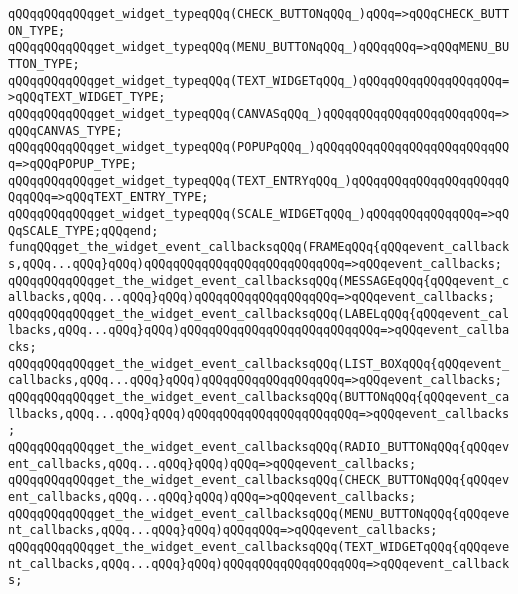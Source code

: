 \verb|qQQqqQQqqQQqget_widget_typeqQQq(CHECK_BUTTONqQQq_)qQQq=>qQQqCHECK_BUTTON_TYPE;|\newline
\verb|qQQqqQQqqQQqget_widget_typeqQQq(MENU_BUTTONqQQq_)qQQqqQQq=>qQQqMENU_BUTTON_TYPE;|\newline
\verb|qQQqqQQqqQQqget_widget_typeqQQq(TEXT_WIDGETqQQq_)qQQqqQQqqQQqqQQqqQQq=>qQQqTEXT_WIDGET_TYPE;|\newline
\verb|qQQqqQQqqQQqget_widget_typeqQQq(CANVASqQQq_)qQQqqQQqqQQqqQQqqQQqqQQq=>qQQqCANVAS_TYPE;|\newline
\verb|qQQqqQQqqQQqget_widget_typeqQQq(POPUPqQQq_)qQQqqQQqqQQqqQQqqQQqqQQqqQQq=>qQQqPOPUP_TYPE;|\newline
\verb|qQQqqQQqqQQqget_widget_typeqQQq(TEXT_ENTRYqQQq_)qQQqqQQqqQQqqQQqqQQqqQQqqQQq=>qQQqTEXT_ENTRY_TYPE;|\newline
\verb|qQQqqQQqqQQqget_widget_typeqQQq(SCALE_WIDGETqQQq_)qQQqqQQqqQQqqQQq=>qQQqSCALE_TYPE;qQQqend;|\newline
\newline
\verb|funqQQqget_the_widget_event_callbacksqQQq(FRAMEqQQq{qQQqevent_callbacks,qQQq...qQQq}qQQq)qQQqqQQqqQQqqQQqqQQqqQQqqQQq=>qQQqevent_callbacks;|\newline
\verb|qQQqqQQqqQQqget_the_widget_event_callbacksqQQq(MESSAGEqQQq{qQQqevent_callbacks,qQQq...qQQq}qQQq)qQQqqQQqqQQqqQQqqQQq=>qQQqevent_callbacks;|\newline
\verb|qQQqqQQqqQQqget_the_widget_event_callbacksqQQq(LABELqQQq{qQQqevent_callbacks,qQQq...qQQq}qQQq)qQQqqQQqqQQqqQQqqQQqqQQqqQQq=>qQQqevent_callbacks;|\newline
\verb|qQQqqQQqqQQqget_the_widget_event_callbacksqQQq(LIST_BOXqQQq{qQQqevent_callbacks,qQQq...qQQq}qQQq)qQQqqQQqqQQqqQQqqQQq=>qQQqevent_callbacks;|\newline
\verb|qQQqqQQqqQQqget_the_widget_event_callbacksqQQq(BUTTONqQQq{qQQqevent_callbacks,qQQq...qQQq}qQQq)qQQqqQQqqQQqqQQqqQQqqQQq=>qQQqevent_callbacks;|\newline
\verb|qQQqqQQqqQQqget_the_widget_event_callbacksqQQq(RADIO_BUTTONqQQq{qQQqevent_callbacks,qQQq...qQQq}qQQq)qQQq=>qQQqevent_callbacks;|\newline
\verb|qQQqqQQqqQQqget_the_widget_event_callbacksqQQq(CHECK_BUTTONqQQq{qQQqevent_callbacks,qQQq...qQQq}qQQq)qQQq=>qQQqevent_callbacks;|\newline
\verb|qQQqqQQqqQQqget_the_widget_event_callbacksqQQq(MENU_BUTTONqQQq{qQQqevent_callbacks,qQQq...qQQq}qQQq)qQQqqQQq=>qQQqevent_callbacks;|\newline
\verb|qQQqqQQqqQQqget_the_widget_event_callbacksqQQq(TEXT_WIDGETqQQq{qQQqevent_callbacks,qQQq...qQQq}qQQq)qQQqqQQqqQQqqQQqqQQq=>qQQqevent_callbacks;|\newline
